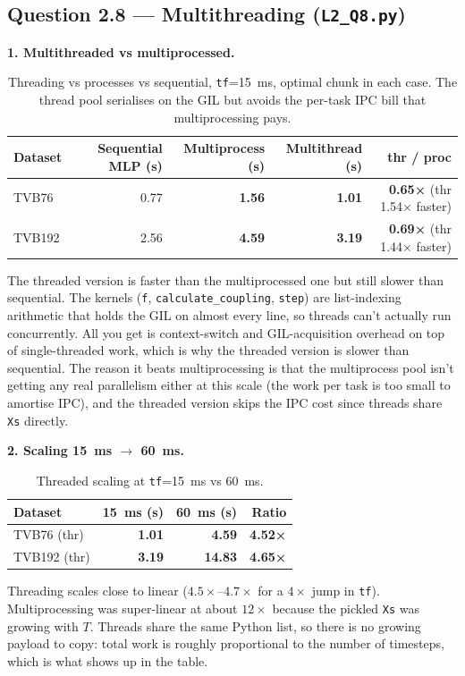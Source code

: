 \documentclass[11pt,a4paper]{article}
\newcommand{\Q}[1]{\subsection*{Question #1}}
\begin{document}
\Q{2.8 — Multithreading (\texttt{L2\_Q8.py})}

\textbf{1. Multithreaded vs multiprocessed.}

\begin{table}[h]
\centering
\small
\begin{tabular}{lrrrr}
\toprule
Dataset & Sequential MLP (s) & Multiprocess (s) & Multithread (s) & thr / proc \\
\midrule
TVB76  & 0.77 & \textbf{1.56} & \textbf{1.01} & \textbf{0.65×} (thr 1.54× faster) \\
TVB192 & 2.56 & \textbf{4.59} & \textbf{3.19} & \textbf{0.69×} (thr 1.44× faster) \\
\bottomrule
\end{tabular}
\caption{Threading vs processes vs sequential, \texttt{tf}=15~ms,
optimal chunk in each case. The thread pool serialises on the GIL but
avoids the per-task IPC bill that multiprocessing pays.}
\end{table}

The threaded version is faster than the multiprocessed one but still
slower than sequential. The kernels (\texttt{f},
\texttt{calculate\_coupling}, \texttt{step}) are list-indexing
arithmetic that holds the GIL on almost every line, so threads can't
actually run concurrently. All you get is context-switch and
GIL-acquisition overhead on top of single-threaded work, which is why
the threaded version is slower than sequential. The reason it beats
multiprocessing is that the multiprocess pool isn't getting any real
parallelism either at this scale (the work per task is too small to
amortise IPC), and the threaded version skips the IPC cost since
threads share \texttt{Xs} directly.

\textbf{2. Scaling 15~ms $\to$ 60~ms.}

\begin{table}[h]
\centering
\small
\begin{tabular}{lrrr}
\toprule
Dataset & 15~ms (s) & 60~ms (s) & Ratio \\
\midrule
TVB76 (thr)  & \textbf{1.01}  & \textbf{4.59}  & \textbf{4.52×} \\
TVB192 (thr) & \textbf{3.19} & \textbf{14.83} & \textbf{4.65×} \\
\bottomrule
\end{tabular}
\caption{Threaded scaling at \texttt{tf}=15~ms vs 60~ms.}
\end{table}

Threading scales close to linear ($4.5\times$--$4.7\times$ for a
$4\times$ jump in \texttt{tf}). Multiprocessing was super-linear at
about $12\times$ because the pickled \texttt{Xs} was growing with
$T$. Threads share the same Python list, so there is no growing
payload to copy: total work is roughly proportional to the number of
timesteps, which is what shows up in the table.
\end{document}
